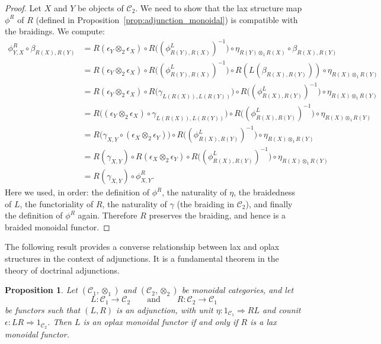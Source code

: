 \documentclass{amsart}
\newtheorem{proposition}{Proposition}[section]
\begin{document}
\begin{proof}
Let $X$ and $Y$ be objects of $\mathcal{C}_2$. We need to show that the lax structure map $\phi^R$ of $R$ (defined in Proposition~\ref{prop:adjunction_monoidal}) is compatible with the braidings. We compute:
\begin{align*}
\phi^R_{Y,X} \circ \beta_{R(X), R(Y)}
&= R(\epsilon_Y \otimes_2 \epsilon_X) \circ R\bigl((\phi^L_{R(Y), R(X)})^{-1}\bigr) \circ \eta_{R(Y) \otimes_1 R(X)} \circ \beta_{R(X), R(Y)} \\
&= R(\epsilon_Y \otimes_2 \epsilon_X) \circ R\bigl((\phi^L_{R(Y), R(X)})^{-1}\bigr) \circ R(L(\beta_{R(X), R(Y)})) \circ \eta_{R(X) \otimes_1 R(Y)} \\
&= R(\epsilon_Y \otimes_2 \epsilon_X) \circ R\bigl(\gamma_{L(R(X)), L(R(Y))}\bigr) \circ R\bigl((\phi^L_{R(X), R(Y)})^{-1}\bigr) \circ \eta_{R(X) \otimes_1 R(Y)} \\
&= R\bigl((\epsilon_Y \otimes_2 \epsilon_X) \circ \gamma_{L(R(X)), L(R(Y))}\bigr) \circ R\bigl((\phi^L_{R(X), R(Y)})^{-1}\bigr) \circ \eta_{R(X) \otimes_1 R(Y)} \\
&= R\bigl(\gamma_{X,Y} \circ (\epsilon_X \otimes_2 \epsilon_Y)\bigr) \circ R\bigl((\phi^L_{R(X), R(Y)})^{-1}\bigr) \circ \eta_{R(X) \otimes_1 R(Y)} \\
&= R(\gamma_{X,Y}) \circ R(\epsilon_X \otimes_2 \epsilon_Y) \circ R\bigl((\phi^L_{R(X), R(Y)})^{-1}\bigr) \circ \eta_{R(X) \otimes_1 R(Y)} \\
&= R(\gamma_{X,Y}) \circ \phi^R_{X,Y}.
\end{align*}
Here we used, in order: the definition of $\phi^R$, the naturality of $\eta$, the braidedness of $L$, the functoriality of $R$, the naturality of $\gamma$ (the braiding in $\mathcal{C}_2$), and finally the definition of $\phi^R$ again. Therefore $R$ preserves the braiding, and hence is a braided monoidal functor.
\end{proof}

The following result provides a converse relationship between lax and oplax structures in the context of adjunctions. It is a fundamental theorem in the theory of doctrinal adjunctions.

\begin{proposition}\label{prop:oplax_lax_adjunction}
Let $(\mathcal{C}_1, \otimes_1)$ and $(\mathcal{C}_2, \otimes_2)$ be monoidal categories, and let
\[
L \colon \mathcal{C}_1 \longrightarrow \mathcal{C}_2
\qquad\text{and}\qquad
R \colon \mathcal{C}_2 \longrightarrow \mathcal{C}_1
\]
be functors such that $(L, R)$ is an adjunction, with unit $\eta \colon 1_{\mathcal{C}_1} \Rightarrow R L$ and counit $\epsilon \colon L R \Rightarrow 1_{\mathcal{C}_2}$. Then $L$ is an oplax monoidal functor if and only if $R$ is a lax monoidal functor.
\end{proposition}
\end{document}
